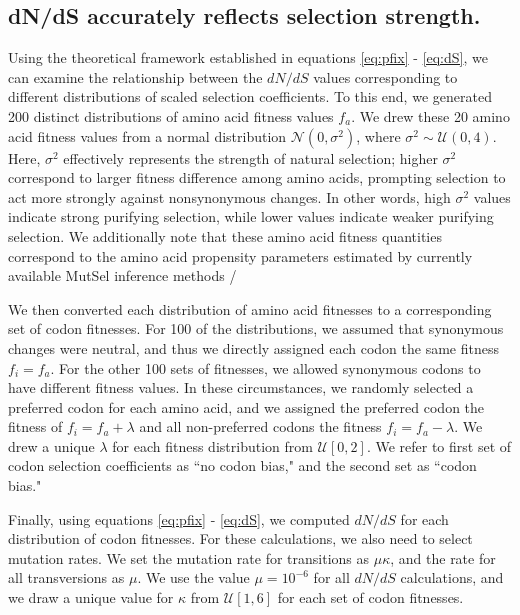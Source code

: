 \documentclass{pnastwo}
\begin{document}
\begin{article}
				
\subsection*{dN/dS accurately reflects selection strength.}

Using the theoretical framework established in equations \eqref{eq:pfix} - \eqref{eq:dS}, we can examine the relationship between the $dN/dS$ values corresponding to different distributions of scaled selection coefficients. To this end, we generated 200 distinct distributions of amino acid fitness values $f_a$. We drew these 20 amino acid fitness values from a normal distribution $\mathcal{N}(0,\sigma^2)$, where $\sigma^2 \sim \mathcal{U}(0,4)$. Here, $\sigma^2$ effectively represents the strength of natural selection; higher $\sigma^2$ correspond to larger fitness difference among amino acids, prompting selection to act more strongly against nonsynonymous changes. In other words, high $\sigma^2$ values indicate strong purifying selection, while lower values indicate weaker purifying selection. We additionally note that these amino acid fitness quantities correspond to the amino acid propensity parameters estimated by currently available MutSel inference methods \cite{RodrigueLartillot2014,Tamuri2014}/

We then converted each distribution of amino acid fitnesses to a corresponding set of codon fitnesses. For 100 of the distributions, we assumed that synonymous changes were neutral, and thus we directly assigned each codon the same fitness $f_i = f_a$. For the other 100 sets of fitnesses, we allowed synonymous codons to have different fitness values. In these circumstances, we randomly selected a preferred codon for each amino acid, and we assigned the preferred codon the fitness of $f_i = f_a + \lambda$ and all non-preferred codons the fitness $f_i = f_a - \lambda$. We drew a unique $\lambda$ for each fitness distribution from $\mathcal{U}[0,2]$. We refer to first set of codon selection coefficients as ``no codon bias," and the second set as ``codon bias." 

Finally, using equations \eqref{eq:pfix} - \eqref{eq:dS}, we computed $dN/dS$ for each distribution of codon fitnesses. For these calculations, we also need to select mutation rates. We set the mutation rate for transitions as $\mu\kappa$, and the rate for all transversions as $\mu$. We use the value $\mu = 10^{-6}$ for all $dN/dS$ calculations, and we draw a  unique value for $\kappa$ from $\mathcal{U}[1,6]$ for each set of codon fitnesses.


\end{article}
\end{document}
